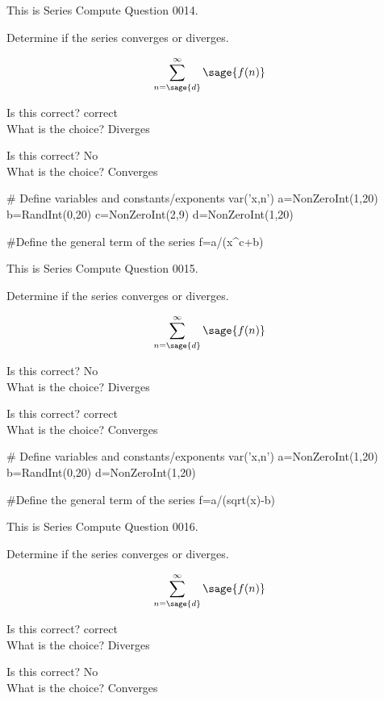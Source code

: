\documentclass{ximera}
\renewcommand{\latexProblemContent}[1]{#1}
\renewcommand{\choice}[2][No]{\item Is this correct? #1 \\ What is the choice? #2}
\begin{document}
\latexProblemContent{
\ifVerboseLocation This is Series Compute Question 0014. \\ \fi
\begin{problem}
Determine if the series converges or diverges.  

\[\sum_{n=\sage{d}}^\infty \sage{f(n)}\]



\begin{multipleChoice}
\choice[correct]{Diverges}
\choice{Converges}
\end{multipleChoice}

\end{problem}}%

\begin{sagesilent}
# Define variables and constants/exponents
var('x,n')
a=NonZeroInt(1,20)
b=RandInt(0,20)
c=NonZeroInt(2,9)
d=NonZeroInt(1,20)

#Define the general term of the series
f=a/(x^c+b)

\end{sagesilent}

\latexProblemContent{
\ifVerboseLocation This is Series Compute Question 0015. \\ \fi
\begin{problem}
Determine if the series converges or diverges.  

\[\sum_{n=\sage{d}}^\infty \sage{f(n)}\]



\begin{multipleChoice}
\choice{Diverges}
\choice[correct]{Converges}
\end{multipleChoice}

\end{problem}}%

\begin{sagesilent}
# Define variables and constants/exponents
var('x,n')
a=NonZeroInt(1,20)
b=RandInt(0,20)
d=NonZeroInt(1,20)

#Define the general term of the series
f=a/(sqrt(x)-b)

\end{sagesilent}

\latexProblemContent{
\ifVerboseLocation This is Series Compute Question 0016. \\ \fi
\begin{problem}
Determine if the series converges or diverges.  

\[\sum_{n=\sage{d}}^\infty \sage{f(n)}\]



\begin{multipleChoice}
\choice[correct]{Diverges}
\choice{Converges}
\end{multipleChoice}

\end{problem}}%
\end{document}
